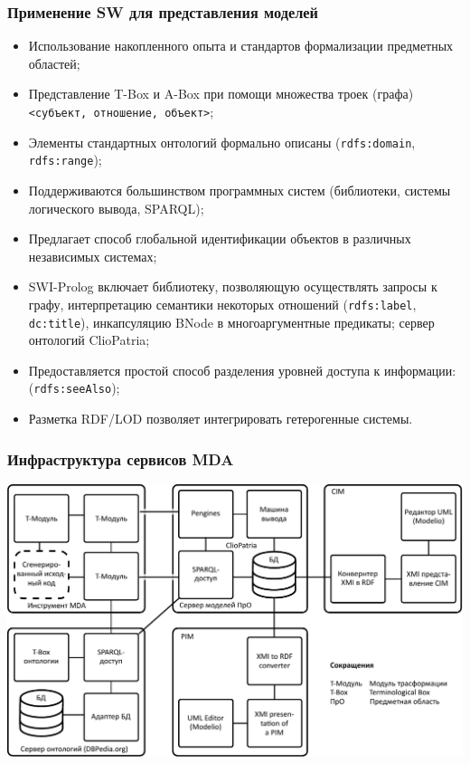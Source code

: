 \documentclass[10pt]{beamer}
\begin{document}
\begin{frame}[fragile]
  \frametitle{Применение SW для представления моделей}
  \begin{itemize}
  \item Использование накопленного опыта и стандартов формализации предметных областей;
  \item Представление T-Box и A-Box при помощи множества троек (графа) \texttt{<субъект, отношение, объект>};
  \item Элементы стандартных онтологий формально описаны (\verb|rdfs:domain|, \verb|rdfs:range|);
  \item Поддерживаются большинством программных систем (библиотеки, системы логического вывода, SPARQL);
  \item Предлагает способ глобальной идентификации объектов в различных независимых системах;
  \item SWI-Prolog включает библиотеку, позволяющую осуществлять запросы к графу, интерпретацию семантики некоторых отношений (\verb|rdfs:label|, \verb|dc:title|), инкапсуляцию BNode в многоаргументные предикаты; сервер онтологий ClioPatria;
  \item Предоставляется простой способ разделения уровней доступа к информации: (\verb|rdfs:seeAlso|);
  \item Разметка RDF/LOD позволяет интегрировать гетерогенные системы.
  \end{itemize}
\end{frame}
\begin{frame}
  \frametitle{Инфраструктура сервисов MDA}
  \centering
  \includegraphics[width=1\linewidth]{architecture-mda-lod-ext-ru.pdf}
\end{frame}
\end{document}
